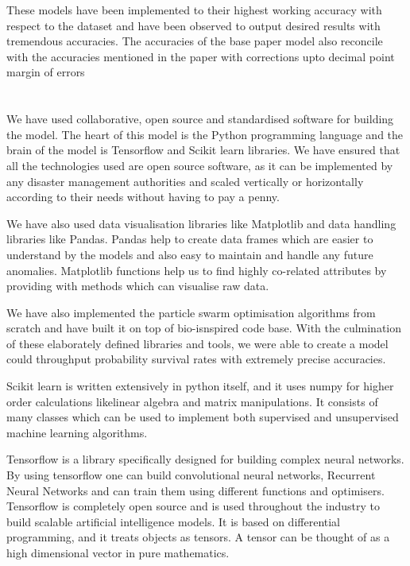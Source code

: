 \documentclass[12pt]{article}
\newcommand{\nd}{\noindent}
\newcommand{\secsize}{\fontsize{15pt}{12pt}\selectfont}
\begin{document}
\nd These models have been implemented to their highest working accuracy with respect to the dataset and have been observed to output desired results with tremendous accuracies. The accuracies of the base paper model also reconcile with the accuracies mentioned in the paper with corrections upto decimal point margin of errors 

\newpage 
\section{\textbf{\secsize{TECHNOLOGY DESIGN}}}
We have used collaborative, open source and standardised software for building the model. The heart of this model is the Python programming language and the brain of the model is Tensorflow  and Scikit learn libraries. We have ensured that all the technologies used are open source software, as it can be implemented by any disaster management authorities and scaled vertically or horizontally according to their needs without having to pay a penny. 

\nd We have also used data visualisation libraries like Matplotlib and data handling libraries like Pandas. Pandas help to create data frames which are easier to understand by the models and also easy to maintain and handle any future anomalies. Matplotlib functions help us to find highly co-related attributes by providing with methods which can visualise raw data. 

\nd We have also implemented the particle swarm optimisation algorithms from scratch and have built it on top of bio-isnspired code base. With the culmination of these elaborately defined libraries and tools, we were able to create a model could throughput probability survival rates with extremely precise accuracies. 

\nd Scikit learn is written extensively in python itself, and it uses numpy for higher order calculations likelinear algebra and matrix manipulations. It consists of many classes which can be used to implement both supervised and unsupervised machine learning algorithms. 

\nd Tensorflow is a library specifically designed for building complex neural networks. By using tensorflow one can build convolutional neural networks, Recurrent Neural Networks and can train them using different functions and optimisers. Tensorflow is completely open source and is used throughout the industry to build scalable artificial intelligence models. It is based on differential programming, and it treats objects as tensors. A tensor can be thought of as a high dimensional vector in pure mathematics. 
\end{document}
